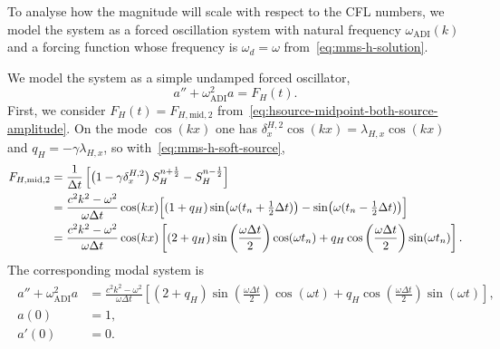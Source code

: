 \documentclass{article}
\numberwithin{figure}{section}
\begin{document}
To analyse how the magnitude will scale with respect to the CFL numbers, we model the system as a forced oscillation system with natural frequency $\omega_{\mathrm{ADI}}(k)$ and a forcing function whose frequency is $\omega_d=\omega$ from~\eqref{eq:mms-h-solution}.

We model the system as a simple undamped forced oscillator,
\begin{equation}
    a''+\omega_{\mathrm{ADI}}^2 a=F_H(t).
    \label{eq:mms-h-forced-oscillator}
\end{equation}
First, we consider $F_H(t)=F_{H,\mathrm{mid,2}}$ from~\eqref{eq:hsource-midpoint-both-source-amplitude}.
On the mode $\cos(kx)$ one has $\delta_x^{H,2}\cos(kx)=\lambda_{H,x}\cos(kx)$ and $q_H=-\gamma\lambda_{H,x}$, so with~\eqref{eq:mms-h-soft-source},
\begin{align}
    \begin{split}
        F_{H,\mathrm{mid,2}}
         & =\frac{1}{\Delta t}\left[\left(1-\gamma\delta_x^{H,2}\right)S_H^{n+\frac{1}{2}}-S_H^{n-\frac{1}{2}}\right] \\
         & =\frac{c^2k^2-\omega^2}{\omega\Delta t}\cos(kx)\Bigl[
            (1+q_H)\sin\bigl(\omega(t_n+\tfrac12\Delta t)\bigr)
            -\sin\bigl(\omega(t_n-\tfrac12\Delta t)\bigr)
        \Bigr]                                                                                                               \\
         & =\frac{c^2k^2-\omega^2}{\omega\Delta t}\cos(kx)\left[
            (2+q_H)\sin\left(\frac{\omega\Delta t}{2}\right)\cos(\omega t_n)
            +q_H\cos\left(\frac{\omega\Delta t}{2}\right)\sin(\omega t_n)
            \right].
    \end{split}
    \label{eq:mms-h-F-mid2-real}
\end{align}
The corresponding modal system is
\begin{align}
    \begin{split}
        a''+\omega_{\mathrm{ADI}}^2 a
         & =\frac{c^2k^2-\omega^2}{\omega\Delta t}\left[
            (2+q_H)\sin\left(\frac{\omega\Delta t}{2}\right)\cos(\omega t)
            +q_H\cos\left(\frac{\omega\Delta t}{2}\right)\sin(\omega t)
        \right],                                            \\
        a(0)
         & =1,                                              \\
        a'(0)
         & =0.
    \end{split}
    \label{eq:mms-h-forced-mid2}
\end{align}
\end{document}

